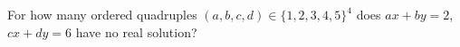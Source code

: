 For how many ordered quadruples $(a,b,c,d)\in\{1,2,3,4,5\}^4 $ does $ ax+by=2 $, $ cx+dy=6 $ have no real solution?

